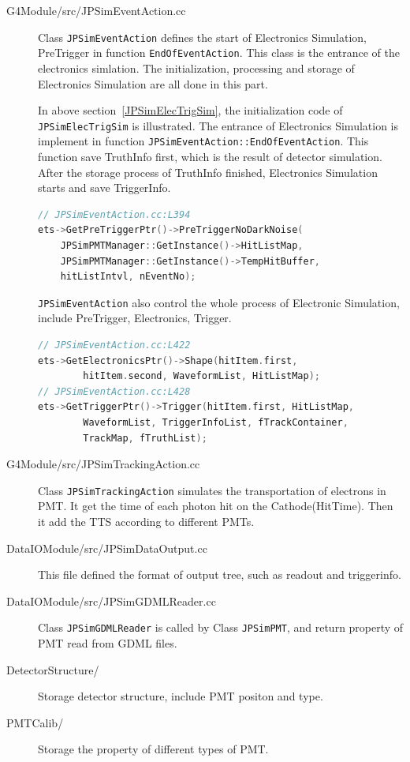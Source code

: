 \begin{description}
    \item[G4Module/src/JPSimEventAction.cc] Class \texttt{JPSimEventAction} defines the start of Electronics Simulation, PreTrigger in function \texttt{EndOfEventAction}.
    This class is the entrance of the electronics simlation. The initialization, processing and storage of Electronics Simulation are all done in this part.

    In above section~\ref{JPSimElecTrigSim}, the initialization code of \texttt{JPSimElecTrigSim} is illustrated. The entrance of Electronics Simulation is implement in function \texttt{JPSimEventAction::EndOfEventAction}.
    This function save TruthInfo first, which is the result of detector simulation. After the storage process of TruthInfo finished, Electronics Simulation starts and save TriggerInfo.
    \begin{lstlisting}[language=C++]
// JPSimEventAction.cc:L394
ets->GetPreTriggerPtr()->PreTriggerNoDarkNoise(
    JPSimPMTManager::GetInstance()->HitListMap, 
    JPSimPMTManager::GetInstance()->TempHitBuffer, 
    hitListIntvl, nEventNo);
    \end{lstlisting}
    \texttt{JPSimEventAction} also control the whole process of Electronic Simulation, include PreTrigger, Electronics, Trigger.
    
    \begin{lstlisting}[language=C++]
// JPSimEventAction.cc:L422
ets->GetElectronicsPtr()->Shape(hitItem.first, 
        hitItem.second, WaveformList, HitListMap);
// JPSimEventAction.cc:L428
ets->GetTriggerPtr()->Trigger(hitItem.first, HitListMap, 
        WaveformList, TriggerInfoList, fTrackContainer, 
        TrackMap, fTruthList);
    \end{lstlisting}
    \item[G4Module/src/JPSimTrackingAction.cc] Class \texttt{JPSimTrackingAction} simulates the transportation of electrons in PMT.
    It get the time of each photon hit on the Cathode(HitTime). Then it add the TTS according to different PMTs.
    \item[DataIOModule/src/JPSimDataOutput.cc] This file defined the format of output tree, such as readout and triggerinfo.
    \item[DataIOModule/src/JPSimGDMLReader.cc] Class \texttt{JPSimGDMLReader} is called by Class \texttt{JPSimPMT}, and return property
    of PMT read from GDML files.
    \item[DetectorStructure/] Storage detector structure, include PMT positon and type.
    \item[PMTCalib/] Storage the property of different types of PMT.
\end{description}
